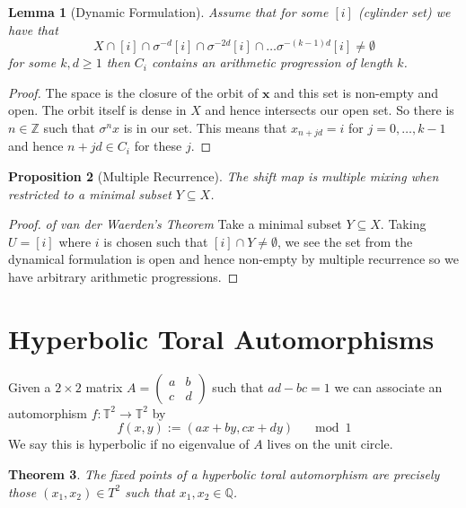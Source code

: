 \documentclass[11pt]{article}
\newcommand{\defeq}{:=}
\newcommand{\Z}{\mathbb{Z}}
\newcommand{\Q}{\mathbb{Q}}
\newcommand{\mv}[1]{\textbf{#1}}
\newenvironment{defin}
	{\begin{mdframed}[backgroundcolor=white, roundcorner=5pt, linewidth=1pt, linecolor=Green]
		\setlength{\parindent}{0pt}}
	{\end{mdframed}}
\newcommand{\mdf}[1]{{\color{Green} #1}}
\newtheorem{theorem}{Theorem}[section]
\newtheorem{lemma}[theorem]{Lemma}
\newtheorem{prop}[theorem]{Proposition}
\begin{document}
\begin{lemma}[Dynamic Formulation]
Assume that for some $[i]$ (cylinder set) we have that
\[
	X\cap [i] \cap \sigma^{-d}[i]\cap \sigma^{-2d}[i] \cap \dots \sigma^{-(k-1)d}[i]\neq\emptyset
\]
for some $k,d\geq 1$ then $C_i$ contains an arithmetic progression of length $k$.
\end{lemma}

\begin{proof}
The space is the closure of the orbit of $\mv{x}$ and this set is non-empty and open.
The orbit itself is dense in $X$ and hence intersects our open set.
So there is $n\in\Z$ such that $\sigma^n x$ is in our set.
This means that $x_{n+jd}=i$ for $j=0, \dots, k-1$ and hence $n+jd\in C_i$ for these $j$.
\end{proof}

\begin{prop}[Multiple Recurrence]
The shift map is multiple mixing when restricted to a minimal subset $Y\subseteq X$.
\end{prop}

\begin{proof}
\textit{of van der Waerden's Theorem}
Take a minimal subset $Y\subseteq X$.
Taking $U=[i]$ where $i$ is chosen such that $[i]\cap Y \neq \emptyset$, we see the set from the dynamical formulation is open and hence non-empty by multiple recurrence so we have arbitrary arithmetic progressions.
\end{proof}

\section{Hyperbolic Toral Automorphisms}

\begin{defin}
Given a $2\times 2$ matrix $A=
\begin{pmatrix}
	a & b \\
	c & d
\end{pmatrix}$ such that $ad-bc=1$ we can associate an automorphism $f:\mathbb{T}^2\to\mathbb{T}^2$ by
\[
	f(x,y)\defeq (ax + by, cx + dy) \quad \mod 1
\]
We say this is \mdf{hyperbolic} if no eigenvalue of $A$ lives on the unit circle.
\end{defin}

\begin{theorem}
The fixed points of a hyperbolic toral automorphism are precisely those $(x_1,x_2)\in T^2$ such that $x_1, x_2\in\Q$.
\end{theorem}
\end{document}
